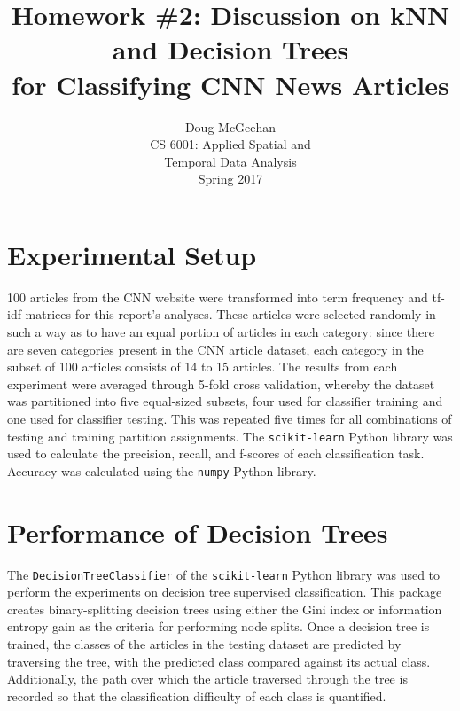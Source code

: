 \documentclass[11pt]{article}
\title{Homework \#2: Discussion on kNN and Decision Trees\\ for Classifying CNN News Articles}
\author{Doug McGeehan\\
		CS 6001: Applied Spatial and \\ Temporal Data Analysis\\
		Spring 2017}
\begin{document}
\maketitle

\section{Experimental Setup}

100 articles from the CNN website were transformed into term frequency and tf-idf matrices for this report's analyses.
These articles were selected randomly in such a way as to have an equal portion of articles in each category: since there are seven categories present in the CNN article dataset, each category in the subset of 100 articles consists of 14 to 15 articles.
The results from each experiment were averaged through 5-fold cross validation,
 whereby the dataset was partitioned into five equal-sized subsets, four used for classifier training and one used for classifier testing.
This was repeated five times for all combinations of testing and training partition assignments.
The \texttt{scikit-learn} Python library was used to calculate the precision, recall, and f-scores of each classification task.
Accuracy was calculated using the \texttt{numpy} Python library.

\section{Performance of Decision Trees} \label{sec:tree}

The \texttt{DecisionTreeClassifier} of the \texttt{scikit-learn} Python library was used to perform the experiments on decision tree supervised classification.
This package creates binary-splitting decision trees using either the Gini index or information entropy gain as the criteria for performing node splits.
Once a decision tree is trained, the classes of the articles in the testing dataset are predicted by traversing the tree, with the predicted class compared against its actual class.
Additionally, the path over which the article traversed through the tree is recorded so that the classification difficulty of each class is quantified.
\end{document}
